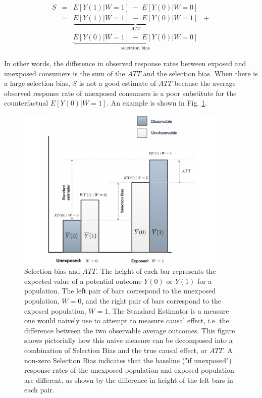 \documentclass[11pt,a4paper]{article}
\theoremstyle{definition}
\theoremstyle{remark}
\theoremstyle{definition}
\theoremstyle{definition}
\theoremstyle{definition}
\theoremstyle{definition}
\theoremstyle{definition}
\theoremstyle{definition}
\begin{document}
\begin{eqnarray*}
S &= & E[ Y(1) | W = 1]  \; -  \; E[ Y(0) | W = 0 ] \\
  &= & \underbrace{E[ Y(1) | W = 1]  \; -  \; E[ Y(0) | W = 1 ]}_{ATT} \; \; + \\ 
  &  & \underbrace{E[ Y(0) | W = 1]  \; -  \; E[ Y(0) | W = 0 ]}_{\text{selection bias}}  
\end{eqnarray*}

In other words, the difference in observed response rates between exposed and unexposed consumers is the sum of the $ATT$ and the selection bias. 
When there is a large selection bias, $S$ is not a good estimate of $ATT$ because the average observed response rate of unexposed consumers is a poor substitute for the counterfactual $E[ Y(0)|W=1 ]$. An example is shown in Fig. \ref{fig-att-bias}.

\begin{figure}\centering
\includegraphics[width=0.9\textwidth]{selection-bias.pdf}
\caption{\small Selection bias and $ATT$. The height of each bar represents the expected value of a potential outcome $Y(0)$ or $Y(1)$ for a population.
 The left pair of bars correspond to the unexposed population, $W=0$, and the right pair of bars correspond to the exposed population, $W=1$. 
 The Standard Estimator is a measure one would naively use to attempt to measure causal effect, i.e. the difference between the two observable average outcomes. 
 This figure shows pictorially how this naive measure can be decomposed into a combination of Selection Bias and the true causal effect, or $ATT$.
 A non-zero Selection Bias indicates that the baseline ("if unexposed") response rates of the unexposed population and exposed population are different, as shown by the difference in height of the left bars in each pair.}\label{fig-att-bias}
\end{figure}
\end{document}

